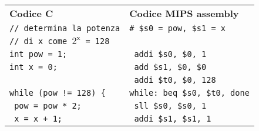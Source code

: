 \documentclass[../main.tex]{subfiles}
\begin{document}
\begin{tabular}{ p{7cm} p{7cm} }
    \textbf{Codice C} & \textbf{Codice MIPS assembly} \\
    \texttt{// determina la potenza} & \texttt{\# \$s0 = pow, \$s1 = x} \\
    \texttt{// di x come $2^\text{x}$ = 128} \\
    \texttt{int pow = 1;} & \texttt{ \hspace*{0cm} \hspace*{0cm} \hspace*{0cm} \hspace*{0cm} \hspace*{0cm} \hspace*{0cm} \hspace*{0cm} addi \$s0, \$0, 1} \\
    \texttt{int x = 0;} & \texttt{ \hspace*{0cm} \hspace*{0cm} \hspace*{0cm} \hspace*{0cm} \hspace*{0cm} \hspace*{0cm} \hspace*{0cm} add \$s1, \$0, \$0} \\
    & \texttt{ \hspace*{0cm} \hspace*{0cm} \hspace*{0cm} \hspace*{0cm} \hspace*{0cm} \hspace*{0cm} \hspace*{0cm} addi \$t0, \$0, 128} \\
    \texttt{while (pow != 128) \{} & \texttt{while: beq \$s0, \$t0, done} \\
    \texttt{\hspace*{0cm} \hspace*{0cm} \hspace*{0cm} pow = pow * 2;} & \texttt{ \hspace*{0cm} \hspace*{0cm} \hspace*{0cm} \hspace*{0cm} \hspace*{0cm} \hspace*{0cm} \hspace*{0cm} sll \$s0, \$s0, 1} \\
    \texttt{\hspace*{0cm} \hspace*{0cm} \hspace*{0cm} x = x + 1;} & \texttt{ \hspace*{0cm} \hspace*{0cm} \hspace*{0cm} \hspace*{0cm} \hspace*{0cm} \hspace*{0cm} \hspace*{0cm} addi \$s1, \$s1, 1} \\

\end{tabular}
\end{document}
